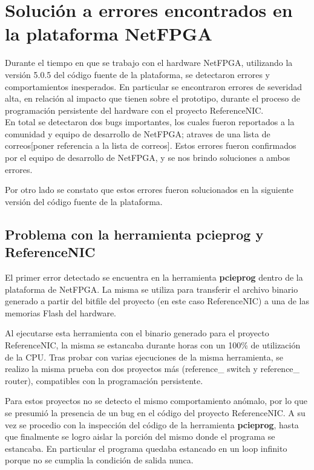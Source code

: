 \chapter{Soluci\'on a errores encontrados en la plataforma NetFPGA} 

Durante el tiempo en que se trabajo con el hardware NetFPGA, utilizando la versi\'on 5.0.5 del c\'odigo fuente de la plataforma, se detectaron errores y comportamientos inesperados. En particular se encontraron errores de severidad alta, en relaci\'on al impacto que tienen sobre el prototipo, durante el proceso de programaci\'on persistente del hardware con el proyecto ReferenceNIC.\\

En total se detectaron dos bugs importantes, los cuales fueron reportados a la comunidad y equipo de desarrollo de NetFPGA; atraves de una lista de correos[poner referencia a la lista de correos]. Estos errores fueron confirmados por el equipo de desarrollo de NetFPGA, y se nos brindo soluciones a ambos errores. 

Por otro lado se constato que estos errores fueron solucionados en la siguiente versi\'on del c\'odigo fuente de la plataforma.\\ 
 
\section{Problema con la herramienta pcieprog y ReferenceNIC}
El primer error detectado se encuentra en la herramienta \textbf{pcieprog} dentro de la plataforma de NetFPGA. La misma se utiliza para transferir el archivo binario generado a partir del bitfile del proyecto (en este caso ReferenceNIC) a una de las memorias Flash del hardware.

Al ejecutarse esta herramienta con el binario generado para el proyecto ReferenceNIC, la misma se estancaba durante horas con un 100\% de utilizaci\'on de la CPU. Tras probar con varias ejecuciones de la misma herramienta, se realizo la misma prueba con dos proyectos m\'as (reference\_ switch y reference\_ router), compatibles con la programaci\'on persistente. 

Para estos proyectos no se detecto el mismo comportamiento an\'omalo, por lo que se presumi\'o la presencia de un bug en el c\'odigo del proyecto ReferenceNIC. A su vez se procedio con la inspecci\'on del c\'odigo de la herramienta \textbf{pcieprog}, hasta que finalmente se logro aislar la porci\'on del mismo donde el programa se estancaba. En particular el programa quedaba estancado en un loop infinito porque no se cumplia la condici\'on de salida nunca.\\ 

